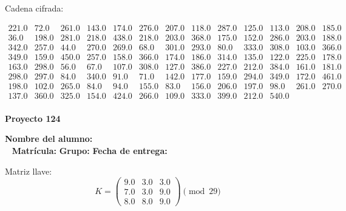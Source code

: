 \documentclass[12pt]{article}
\begin{document}
Cadena cifrada:
\begin{center}
$\begin{array}{lllllllllllll}
221.0 & 72.0 & 261.0 & 143.0 & 174.0 & 276.0 & 207.0 & 118.0 & 287.0 & 125.0 & 113.0 & 208.0 & 185.0\\
36.0 & 198.0 & 281.0 & 218.0 & 438.0 & 218.0 & 203.0 & 368.0 & 175.0 & 152.0 & 286.0 & 203.0 & 188.0\\
342.0 & 257.0 & 44.0 & 270.0 & 269.0 & 68.0 & 301.0 & 293.0 & 80.0 & 333.0 & 308.0 & 103.0 & 366.0\\
349.0 & 159.0 & 450.0 & 257.0 & 158.0 & 366.0 & 174.0 & 186.0 & 314.0 & 135.0 & 122.0 & 225.0 & 178.0\\
163.0 & 298.0 & 56.0 & 67.0 & 107.0 & 308.0 & 127.0 & 386.0 & 227.0 & 212.0 & 384.0 & 161.0 & 181.0\\
298.0 & 297.0 & 84.0 & 340.0 & 91.0 & 71.0 & 142.0 & 177.0 & 159.0 & 294.0 & 349.0 & 172.0 & 461.0\\
198.0 & 102.0 & 265.0 & 84.0 & 94.0 & 155.0 & 83.0 & 156.0 & 206.0 & 197.0 & 98.0 & 261.0 & 270.0\\
137.0 & 360.0 & 325.0 & 154.0 & 424.0 & 266.0 & 109.0 & 333.0 & 399.0 & 212.0 & 540.0\\
\end{array}$
\end{center}

\newpage


\textbf{Proyecto 124}

\textbf{Nombre del alumno:} \underline{\hspace{13cm}}\\\
\vspace{1cm}
\textbf{Matrícula:} \underline{\hspace{4cm}} \hspace{1cm}
\textbf{Grupo:} \underline{\hspace{2cm}}
\textbf{Fecha de entrega:} \underline{\hspace{2cm}}

\medskip

Matriz llave:
\[
K = \begin{pmatrix}
9.0 & 3.0 & 3.0\\
7.0 & 3.0 & 9.0\\
8.0 & 8.0 & 9.0
\end{pmatrix} \pmod{29}
\]
\end{document}
